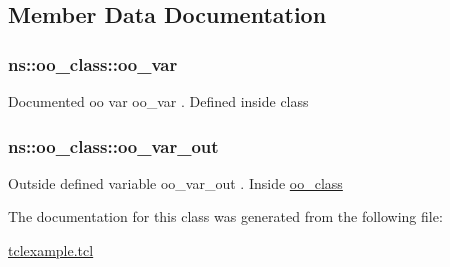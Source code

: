 \subsection{Member Data Documentation}
\hypertarget{classns_1_1oo__class_a741f11f4a2db3876205658d4a9a279ba}{
\subsubsection[{oo\-\_\-var}]{\setlength{\rightskip}{0pt plus 5cm}ns\-::oo\-\_\-class\-::oo\-\_\-var\hspace{0.3cm}{\ttfamily [static]}}}\label{classns_1_1oo__class_a741f11f4a2db3876205658d4a9a279ba}
Documented oo var {\ttfamily oo\-\_\-var} . Defined inside class \hypertarget{classns_1_1oo__class_af46293ede16067c38ca2901416cad8ee}{
\subsubsection[{oo\-\_\-var\-\_\-out}]{\setlength{\rightskip}{0pt plus 5cm}ns\-::oo\-\_\-class\-::oo\-\_\-var\-\_\-out\hspace{0.3cm}{\ttfamily [static]}}}\label{classns_1_1oo__class_af46293ede16067c38ca2901416cad8ee}
Outside defined variable {\ttfamily oo\-\_\-var\-\_\-out} . Inside \hyperlink{classns_1_1oo__class}{oo\-\_\-class} 

The documentation for this class was generated from the following file\-:\begin{DoxyCompactItemize}
\item 
\hyperlink{tclexample_8tcl}{tclexample.\-tcl}\end{DoxyCompactItemize}
